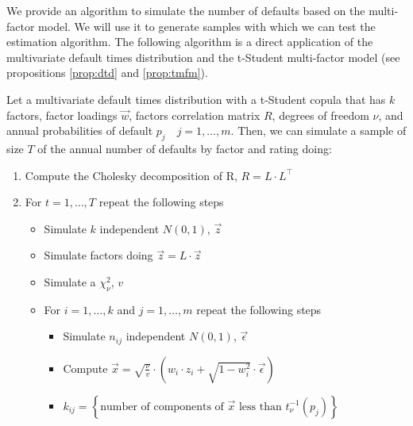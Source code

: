 \documentclass[11pt,fleqn]{book} %
\begin{document}
We provide an algorithm to simulate the number of defaults based on
the multi-factor model. We will use it to generate samples with which 
we can test the estimation algorithm. The following algorithm is 
a direct application of the multivariate default times distribution
and the t-Student multi-factor model (see propositions \ref{prop:dtd} 
and \ref{prop:tmfm}).

\begin{algorithm}
	\label{alg:snod}
	Let a multivariate default times distribution with a t-Student copula
	that has $k$ factors, factor loadings $\vec{w}$, factors correlation 
	matrix $R$, degrees of freedom $\nu$, and annual probabilities of
	default $p_j \quad j=1,\dots,m$. Then, we can simulate a sample of 
	size $T$ of the annual number of defaults by factor and rating doing:
	\begin{enumerate}
		\item Compute the Cholesky decomposition of R, $R = L \cdot L^\intercal$
		\item For $t=1,\dots,T$ repeat the following steps
		\begin{itemize}
			\item Simulate $k$ independent $N(0,1)$, $\vec{z}$
			\item Simulate factors doing $\vec{z} = L \cdot \vec{z}$
			\item Simulate a $\chi_{\nu}^2$, $v$
			\item For $i=1,\dots,k$ and $j=1,\dots,m$ repeat the following steps
			\begin{itemize}
				\item Simulate $n_{ij}$ independent $N(0,1)$, $\vec{\epsilon}$
				\item Compute $\vec{x} = \sqrt{\frac{\nu}{v}} \cdot \left( w_i \cdot z_i + \sqrt{1-w_i^2} \cdot \vec{\epsilon} \right)$
				\item $k_{ij} = \left\{ \text{number of components of $\vec{x}$ less than $t_{\nu}^{-1}(p_j)$} \right\} $
			\end{itemize}
		\end{itemize}
	\end{enumerate}
\end{algorithm}
\end{document}
